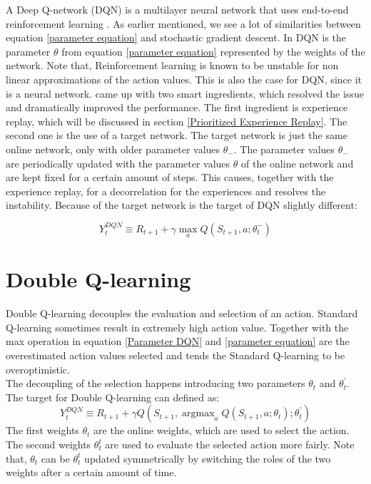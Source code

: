 \documentclass{sig-alternate}
\DeclareMathOperator*{\argmax}{argmax} %
\begin{document}
A Deep Q-network (DQN) is a multilayer neural network that uses end-to-end reinforcement learning \cite{mnih2015human}. As earlier mentioned, we see a lot of similarities between equation \ref{parameter equation} and stochastic gradient descent. In DQN is the parameter $\theta$ from equation \ref{parameter equation} represented by the weights of the network. Note that, Reinforcement learning is known to be unstable for non linear approximations of the action values. This is also the case for DQN, since it is a neural network. \cite{mnih2015human} came up with two smart ingredients, which resolved the issue and dramatically improved the performance. The first ingredient is experience replay, which will be discussed in section \ref{Prioritized Experience Replay}. The second one is the use of a target network. The target network is just the same online network, only with older parameter values $\theta_{-}$. The parameter values $\theta_{-}$ are periodically updated with the parameter values $\theta$ of the online network and are kept fixed for a certain amount of steps. This causes, together with the experience replay, for a decorrelation for the experiences and resolves the instability. Because of the target network is the target of DQN slightly different:
 
\begin{equation}
\label{Parameter DQN}
Y_{t}^{DQN} \equiv R_{t+1} + \gamma \max_{a}Q(S_{t+1},a;\theta_{t}^{-})
\end{equation}



\section{Double Q-learning}\label{Double Q-learning}

Double Q-learning \cite{hasselt2010double} decouples the evaluation and selection of an action. Standard Q-learning sometimes result in extremely high action value. Together with the max operation in equation \ref{Parameter DQN} and \ref{parameter equation} are the overestimated action values selected and tends the Standard Q-learning to be overoptimistic.\cite{van2016deep}\\
\newline
The decoupling of the selection happens introducing two parameters $\theta_{t}$ and $\theta_{t}^{'}$. The target for Double Q-learning can defined as:
\begin{equation}
\label{Double Q Parameter}
Y_{t}^{DQN} \equiv R_{t+1} + \gamma Q(S_{t+1},\argmax_{a}Q(S_{t+1},a;\theta_{t});\theta_{t}^{'})
\end{equation}
The first weights $\theta_{t}$ are the online weights, which are used to select the action. The second weights $\theta_{t}^t$ are used to evaluate the selected action more fairly.
Note that,  $\theta_{t}$ can be $\theta_{t}^t$ updated symmetrically by switching the roles of the two weights after a certain amount of time.
\end{document}
